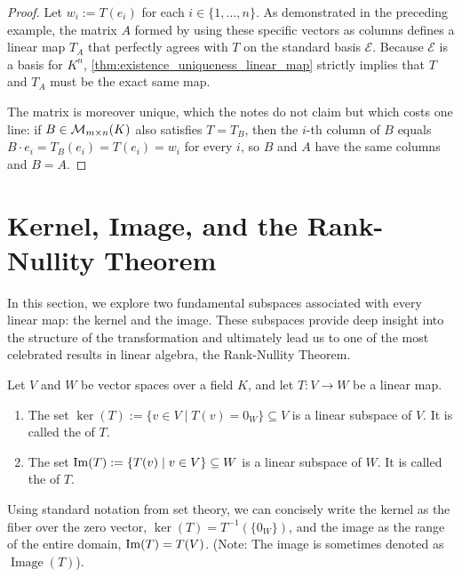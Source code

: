 \begin{proof}
Let $w_i := T(e_i)$ for each $i \in \{1, \dots, n\}$. As demonstrated in the preceding example, the matrix $A$ formed by using these specific vectors as columns defines a linear map $T_A$ that perfectly agrees with $T$ on the standard basis $\mathcal{E}$. Because $\mathcal{E}$ is a basis for $K^n$, \cref{thm:existence_uniqueness_linear_map} strictly implies that $T$ and $T_A$ must be the exact same map.

The matrix is moreover unique, which the notes do not claim but which costs one line: if $B \in \mathcal{M}_{m \times n}(K)$ also satisfies $T = T_B$, then the $i$-th column of $B$ equals $B \cdot e_i = T_B(e_i) = T(e_i) = w_i$ for every $i$, so $B$ and $A$ have the same columns and $B = A$.
\end{proof}
\renewcommand{\thetheorem}{15.b.\arabic{theorem}}
\setcounter{theorem}{0}
\section{Kernel, Image, and the Rank-Nullity Theorem}
\label{sec:kernel_image_rank}

In this section, we explore two fundamental subspaces associated with every linear map: the kernel and the image. These subspaces provide deep insight into the structure of the transformation and ultimately lead us to one of the most celebrated results in linear algebra, the Rank-Nullity Theorem.

\begin{proposition}
\label{prop:kernel_image}
Let $V$ and $W$ be vector spaces over a field $K$, and let $T: V \to W$ be a linear map.
\begin{enumerate}[label=\textbf{(\alph*)}]
    \item The set $\ker(T) := \{v \in V \mid T(v) = 0_W\} \subseteq V$ is a linear subspace of $V$. It is called the  of $T$.
    \item The set $\operatorname{Im}(T) := \{T(v) \mid v \in V\} \subseteq W$ is a linear subspace of $W$. It is called the  of $T$.
\end{enumerate}
\end{proposition}

\begin{remark}
\label{rem:set_theoretic_notation}
Using standard notation from set theory, we can concisely write the kernel as the fiber over the zero vector, $\ker(T) = T^{-1}(\{0_W\})$, and the image as the range of the entire domain, $\operatorname{Im}(T) = T(V)$. (Note: The image is sometimes denoted as $\operatorname{Image}(T)$).
\end{remark}

